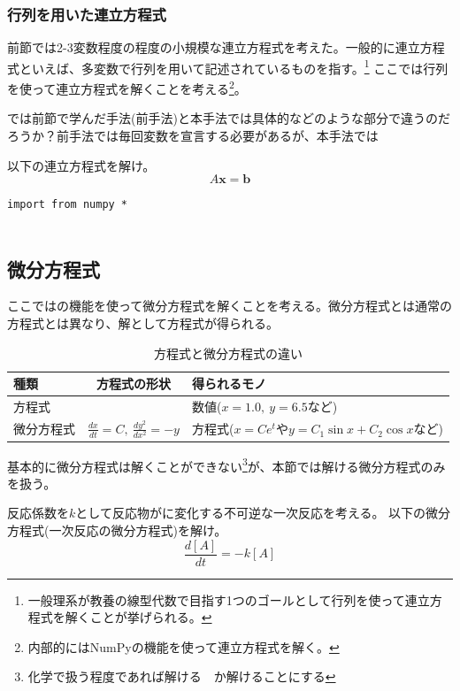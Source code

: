 \documentclass[dvipdfmx, leqno]{jsreport}
\begin{document}
\subsubsection{行列を用いた連立方程式}
    前節では2-3変数程度の程度の小規模な連立方程式を考えた。一般的に連立方程式といえば、多変数で行列を用いて記述されているものを指す。\footnote{一般理系が教養の線型代数で目指す1つのゴールとして行列を使って連立方程式を解くことが挙げられる。}
    ここでは行列を使って連立方程式を解くことを考える\footnote{内部的にはNumPyの機能を使って連立方程式を解く。}。

    では前節で学んだ手法(前手法)と本手法では具体的などのような部分で違うのだろうか？前手法では毎回変数を宣言する必要があるが、本手法では
\begin{tcolorbox}
    以下の連立方程式を解け。
\begin{equation}\label{eq:行列を用いる連立方程式}
    A\bm{x}= \bm{b}
\end{equation}
\end{tcolorbox}

\begin{lstlisting}[caption= {Pythonで行列を用いた連立方程式を解く}, label= {Pythonで行列を用いた連立方程式を解く}]
    import from numpy *
    
\end{lstlisting}

\subsection{微分方程式}%
    ここではの機能を使って微分方程式を解くことを考える。微分方程式とは通常の方程式とは異なり、解として方程式が得られる。
\begin{table}[h]
\caption{方程式と微分方程式の違い}
\begin{center}
\begin{tabular}{lcl}\hline\hline
    種類& 方程式の形状&得られるモノ\\ \hline
    方程式& & 数値($x= 1.0,\ y= 6.5$など)\\
    微分方程式& $\frac{dx}{dt}= C,\ \frac{dy^2}{dx^2}= -y$& 方程式($x= Ce^t$や$y= C_1\sin{x}+ C_2\cos{x}$など)\\ \hline\hline
\end{tabular}
\end{center}
\end{table}
    基本的に微分方程式は解くことができない\footnote{化学で扱う程度であれば解ける　か解けることにする}が、本節では解ける微分方程式のみを扱う。
\begin{tcolorbox}
    反応係数を$k$として反応物がに変化する不可逆な一次反応を考える。
    以下の微分方程式(一次反応の微分方程式)を解け。
\begin{equation}\label{eq:微分方程式}
    \frac{d[A]}{dt}= -k[A]
\end{equation}
\end{tcolorbox}
\end{document}
